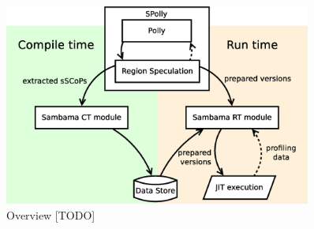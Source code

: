 \begin{figure}[htbp]
  \centering
  \includegraphics[width=0.9\textwidth]{Figures/Overview.eps}
  \caption{Overview [TODO]}
  \label{fig:Overview}  
\end{figure}
